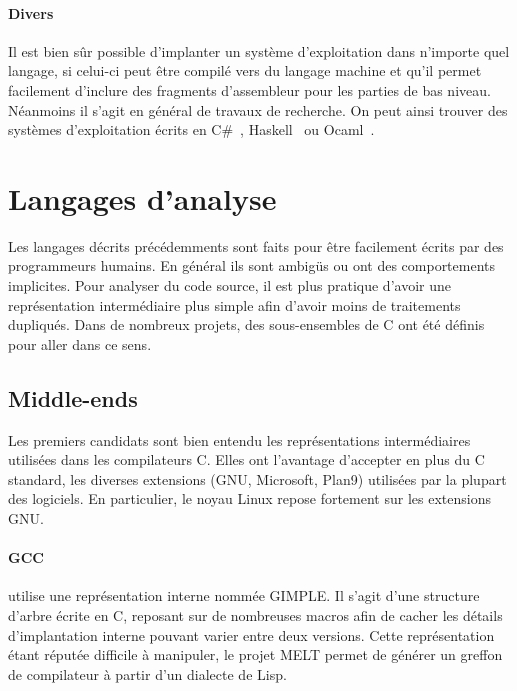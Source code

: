\paragraph{Divers} %

Il est bien sûr possible d'implanter un système d'exploitation dans n'importe
quel langage, si celui-ci peut être compilé vers du langage machine et qu'il
permet facilement d'inclure des fragments d'assembleur pour les parties de bas
niveau. Néanmoins il s'agit en général de travaux de recherche. On peut ainsi
trouver des systèmes d'exploitation écrits en C\#~\cite{SingularityOverview},
Haskell~\cite{HaskellOS} ou Ocaml~\cite{unikernels}.


\section{Langages d'analyse}

Les langages décrits précédemments sont faits pour être facilement écrits par
des programmeurs humains. En général ils sont ambigüs ou ont des comportements
implicites. Pour analyser du code source, il est plus pratique d'avoir une
représentation intermédiaire plus simple afin d'avoir moins de traitements
dupliqués. Dans de nombreux projets, des sous-ensembles de C ont été définis
pour aller dans ce sens.

\subsection*{Middle-ends}

Les premiers candidats sont bien entendu les représentations intermédiaires
utilisées dans les compilateurs C. Elles ont l'avantage d'accepter en plus du C
standard, les diverses extensions (GNU, Microsoft, Plan9) utilisées par la
plupart des logiciels. En particulier, le noyau Linux repose fortement sur les
extensions GNU.

\paragraph{GCC} utilise une représentation interne nommée
GIMPLE\cite{gcc-gimple}. Il s'agit d'une structure d'arbre écrite en C, reposant
sur de nombreuses macros afin de cacher les détails d'implantation interne
pouvant varier entre deux versions. Cette représentation étant réputée difficile
à manipuler, le projet MELT\cite{gcc-melt} permet de générer un greffon de
compilateur à partir d'un dialecte de Lisp.

